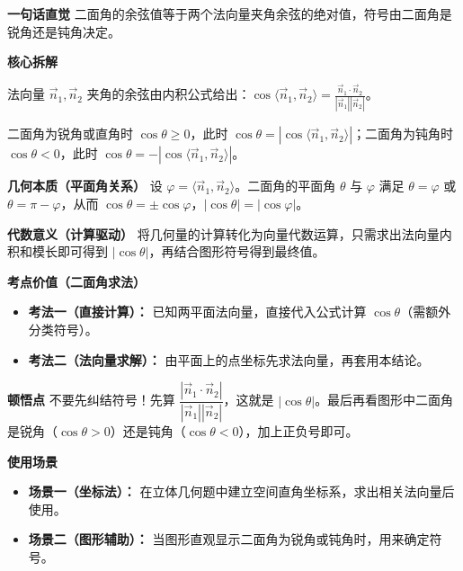 \begin{explanationbox}
	\textbf{\textcolor{CExplanation}{一句话直觉}}
	二面角的余弦值等于两个法向量夹角余弦的绝对值，符号由二面角是锐角还是钝角决定。

	\medskip
	\textbf{\textcolor{CExplanation}{核心拆解}}
	\begin{description}[style=nextline, leftmargin=2.8em, labelsep=0.5em, itemsep=0.45em]
		\item[\textbf{要点一（向量夹角）：}]
			法向量 $\vec{n}_1,\vec{n}_2$ 夹角的余弦由内积公式给出：$\cos\langle\vec{n}_1,\vec{n}_2\rangle = \frac{\vec{n}_1\cdot\vec{n}_2}{|\vec{n}_1||\vec{n}_2|}$。
		\item[\textbf{要点二（符号规则）：}]
			二面角为锐角或直角时 $\cos\theta\ge 0$，此时 $\cos\theta = |\cos\langle\vec{n}_1,\vec{n}_2\rangle|$；二面角为钝角时 $\cos\theta<0$，此时 $\cos\theta = -|\cos\langle\vec{n}_1,\vec{n}_2\rangle|$。
	\end{description}

	\medskip
	\textbf{\textcolor{CExplanation}{几何本质（平面角关系）}}
	设 $\varphi = \langle\vec{n}_1,\vec{n}_2\rangle$。二面角的平面角 $\theta$ 与 $\varphi$ 满足 $\theta = \varphi$ 或 $\theta = \pi-\varphi$，从而 $\cos\theta = \pm\cos\varphi$，$|\cos\theta| = |\cos\varphi|$。

	\medskip
	\textbf{\textcolor{CExplanation}{代数意义（计算驱动）}}
	将几何量的计算转化为向量代数运算，只需求出法向量内积和模长即可得到 $|\cos\theta|$，再结合图形符号得到最终值。

	\medskip
	\textbf{\textcolor{CExplanation}{考点价值（二面角求法）}}
	\begin{itemize}[leftmargin=*, itemsep=0.5em, topsep=0.4em]
		\item \textbf{考法一（直接计算）：} 已知两平面法向量，直接代入公式计算 $\cos\theta$（需额外分类符号）。
		\item \textbf{考法二（法向量求解）：} 由平面上的点坐标先求法向量，再套用本结论。
	\end{itemize}

	\medskip
	\textbf{\textcolor{CExplanation}{顿悟点}}
	不要先纠结符号！先算 $\dfrac{|\vec{n}_1\cdot\vec{n}_2|}{|\vec{n}_1||\vec{n}_2|}$，这就是 $|\cos\theta|$。最后再看图形中二面角是锐角（$\cos\theta>0$）还是钝角（$\cos\theta<0$），加上正负号即可。

	\medskip
	\textbf{\textcolor{CExplanation}{使用场景}}
	\begin{itemize}[leftmargin=*, itemsep=0.5em, topsep=0.4em]
		\item \textbf{场景一（坐标法）：} 在立体几何题中建立空间直角坐标系，求出相关法向量后使用。
		\item \textbf{场景二（图形辅助）：} 当图形直观显示二面角为锐角或钝角时，用来确定符号。
	\end{itemize}

\end{explanationbox}
